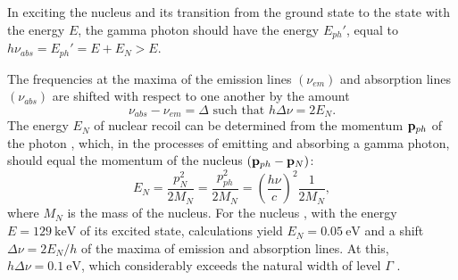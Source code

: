 In exciting the nucleus and its transition from the ground state to the state with the energy $E$, the gamma photon should have the energy $E_{ph}'$, equal to $h\nu_{abs} = E_{ph}' = E + E_{N} > E$.

The frequencies at the maxima of the emission lines $(\nu_{em})$ and absorption lines $(\nu_{abs})$ are shifted with respect to one another by the amount
\begin{equation*}%
\nu_{abs} - \nu_{em} = \Delta \text{ such that } h \Delta \nu = 2 E_{N}.
\end{equation*} 
The energy $E_{N}$ of nuclear recoil can be determined from the momentum $\vb{p}_{ph}$ of the photon , which, in the processes of emitting and absorbing a gamma photon, should equal the momentum of the nucleus $(\vb{p}_{ph} - \vb{p}_{N})$:
\begin{equation*}%
E_{N} = \frac{p^{2}_{N}}{2M_{N}} =\frac{p^{2}_{ph}}{2M_{N}} = \left( \frac{h \nu}{c}\right)^{2} \frac{1}{2M_{N}},
\end{equation*}
where $M_{N}$ is the mass of the nucleus. For the nucleus , with the energy $E = \SI{129}{\keV}$ of its excited state, calculations yield $E_{N} = \SI{0.05}{\eV}$ and a shift $\Delta \nu = 2E_{N}/h$ of the maxima of
emission and absorption lines. At this, $h \Delta \nu = \SI{0.1}{\eV}$, which considerably exceeds the natural width of level $\Gamma$ .

